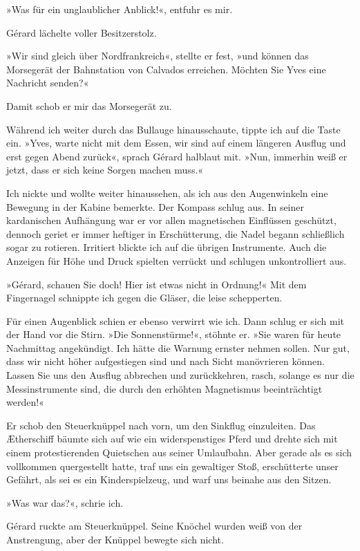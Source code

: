 »Was für ein unglaublicher Anblick!«, entfuhr es mir.

Gérard lächelte voller Besitzerstolz.

»Wir sind gleich über Nordfrankreich«, stellte er fest, »und können
das Morsegerät der Bahnstation von Calvados erreichen. Möchten Sie
Yves eine Nachricht senden?«

Damit schob er mir das Morsegerät zu.

Während ich weiter durch das Bullauge hinausschaute, tippte ich auf
die Taste ein. »Yves, warte nicht mit dem Essen, wir sind auf einem
längeren Ausflug und erst gegen Abend zurück«, sprach Gérard
halblaut mit. »Nun, immerhin weiß er jetzt, dass er sich keine
Sorgen machen muss.«

Ich nickte und wollte weiter hinaussehen, als ich aus den
Augenwinkeln eine Bewegung in der Kabine bemerkte. Der Kompass
schlug aus. In seiner kardanischen Aufhängung war er vor allen
magnetischen Einflüssen geschützt, dennoch geriet er immer heftiger
in Erschütterung, die Nadel begann schließlich sogar zu rotieren.
Irritiert blickte ich auf die übrigen Instrumente. Auch die
Anzeigen für Höhe und Druck spielten verrückt und schlugen
unkontrolliert aus.

»Gérard, schauen Sie doch! Hier ist etwas nicht in Ordnung!« Mit
dem Fingernagel schnippte ich gegen die Gläser, die leise
schepperten.

Für einen Augenblick schien er ebenso verwirrt wie ich. Dann schlug
er sich mit der Hand vor die Stirn. »Die Sonnenstürme!«, stöhnte
er. »Sie waren für heute Nachmittag angekündigt. Ich hätte die
Warnung ernster nehmen sollen. Nur gut, dass wir nicht höher
aufgestiegen sind und nach Sicht manövrieren können. Lassen Sie uns
den Ausflug abbrechen und zurückkehren, rasch, solange es nur die
Messinstrumente sind, die durch den erhöhten Magnetismus
beeinträchtigt werden!«

Er schob den Steuerknüppel nach vorn, um den Sinkflug einzuleiten.
Das Ætherschiff bäumte sich auf wie ein widerspenstiges Pferd und
drehte sich mit einem protestierenden Quietschen aus seiner
Umlaufbahn. Aber gerade als es sich vollkommen quergestellt hatte,
traf uns ein gewaltiger Stoß, erschütterte unser Gefährt, als sei
es ein Kinderspielzeug, und warf uns beinahe aus den Sitzen.

»Was war das?«, schrie ich.

Gérard ruckte am Steuerknüppel. Seine Knöchel wurden weiß von der
Anstrengung, aber der Knüppel bewegte sich nicht.

